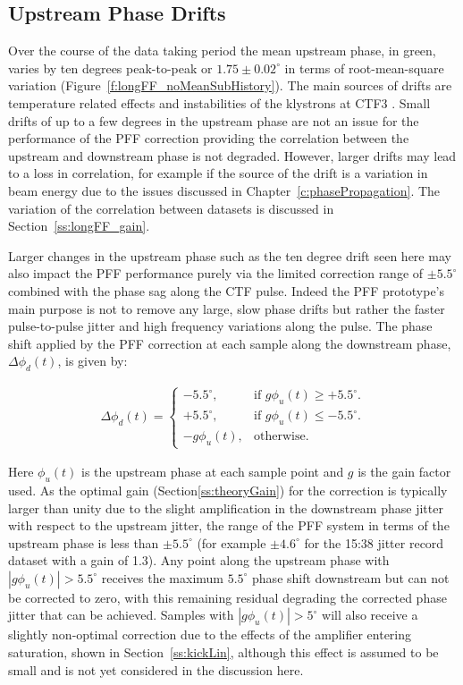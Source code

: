\subsection{Upstream Phase Drifts}
\label{ss:longFF_upDrifts}

Over the course of the data taking period the mean upstream phase, in green, varies by ten degrees peak-to-peak or \(1.75 \pm 0.02^\circ\) in terms of root-mean-square variation (Figure~\ref{f:longFF_noMeanSubHistory}). The main sources of drifts are temperature related effects and instabilities of the klystrons at CTF3 \cite{lukasIPAC16}. Small drifts of up to a few degrees in the upstream phase are not an issue for the performance of the PFF correction providing the correlation between the upstream and downstream phase is not degraded. However, larger drifts may lead to a loss in correlation, for example if the source of the drift is a variation in beam energy due to the issues discussed in Chapter~\ref{c:phasePropagation}. The variation of the correlation between datasets is discussed in Section~\ref{ss:longFF_gain}.

Larger changes in the upstream phase such as the ten degree drift seen here may also impact the PFF performance purely via the limited correction range of \(\pm5.5^\circ\) combined with the phase sag along the CTF pulse. Indeed the PFF prototype's main purpose is not to remove any large, slow phase drifts but rather the faster pulse-to-pulse jitter and high frequency variations along the pulse. The phase shift applied by the PFF correction at each sample along the downstream phase, \(\Delta\phi_d(t)\), is given by:

\begin{eqnarray}
	\Delta\phi_d(t) = \begin{cases}
	-5.5^\circ, &  \text{if $g\phi_u(t) \geq+5.5^\circ$.}\\
	+5.5^\circ, &  \text{if $g\phi_u(t)\leq-5.5^\circ$}.\\
	-g\phi_u(t), &  \text{otherwise.}
	\end{cases}
	\label{e:limCorrection}
\end{eqnarray}

Here \(\phi_u(t)\) is the upstream phase at each sample point and \(g\) is the gain factor used. As the optimal gain (Section\ref{ss:theoryGain}) for the correction is typically larger than unity due to the slight amplification in the downstream phase jitter with respect to the upstream jitter, the range of the PFF system in terms of the upstream phase is less than \(\pm5.5^\circ\) (for example \(\pm4.6^\circ\) for the 15:38 jitter record dataset with a gain of 1.3). Any point along the upstream phase with \(|g\phi_u(t)| > 5.5^\circ\) receives the maximum \(5.5^\circ\) phase shift downstream but can not be corrected to zero, with this remaining residual degrading the corrected phase jitter that can be achieved. Samples with  \(|g\phi_u(t)| > 5^\circ\) will also receive a slightly non-optimal correction due to the effects of the amplifier entering saturation, shown in Section~\ref{ss:kickLin}, although this effect is assumed to be small and is not yet considered in the discussion here.

